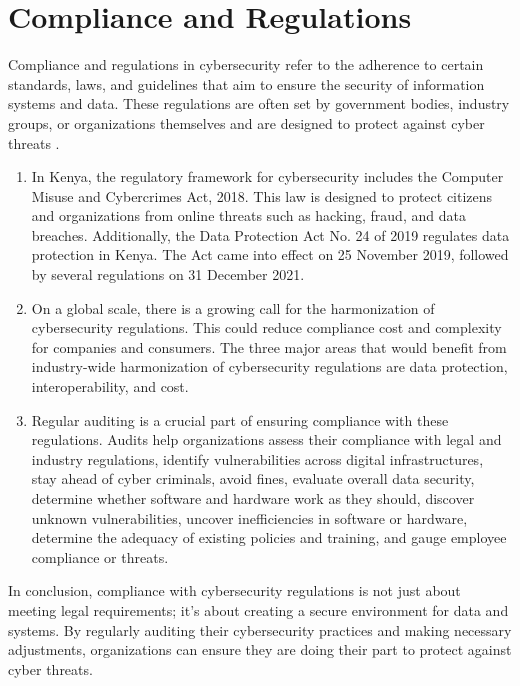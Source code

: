 \documentclass{article}
\begin{document}
\section{Compliance and Regulations}
Compliance and regulations in cybersecurity refer to the adherence to certain standards, laws, and guidelines that aim to ensure the security of information systems and data. These regulations are often set by government bodies, industry groups, or organizations themselves and are designed to protect against cyber threats \cite{comptia-no-date}.
\begin{enumerate}[label=\alph*)]
    \item In Kenya, the regulatory framework for cybersecurity includes the Computer Misuse and Cybercrimes Act, 2018\cite{east-africa-hi-tech-solutions-laws-regulations-2023}. This law is designed to protect citizens and organizations from online threats such as hacking, fraud, and data breaches\cite{east-africa-hi-tech-solutions-laws-regulations-2023}. Additionally, the Data Protection Act No. 24 of 2019 regulates data protection in Kenya\cite{macoduol-2022}. The Act came into effect on 25 November 2019, followed by several regulations on 31 December 2021\cite{macoduol-2022}.
    \item On a global scale, there is a growing call for the harmonization of cybersecurity regulations. This could reduce compliance cost and complexity for companies and consumers\cite{world-economic-forum-2023}. The three major areas that would benefit from industry-wide harmonization of cybersecurity regulations are data protection, interoperability, and cost\cite{world-economic-forum-2023}.
    \item Regular auditing is a crucial part of ensuring compliance with these regulations. Audits help organizations assess their compliance with legal and industry regulations, identify vulnerabilities across digital infrastructures, stay ahead of cyber criminals, avoid fines, evaluate overall data security, determine whether software and hardware work as they should, discover unknown vulnerabilities, uncover inefficiencies in software or hardware, determine the adequacy of existing policies and training, and gauge employee compliance or threats\cite{miller-2023}.
    



\end{enumerate}
In conclusion, compliance with cybersecurity regulations is not just about meeting legal requirements; it’s about creating a secure environment for data and systems. By regularly auditing their cybersecurity practices and making necessary adjustments, organizations can ensure they are doing their part to protect against cyber threats.
\end{document}
